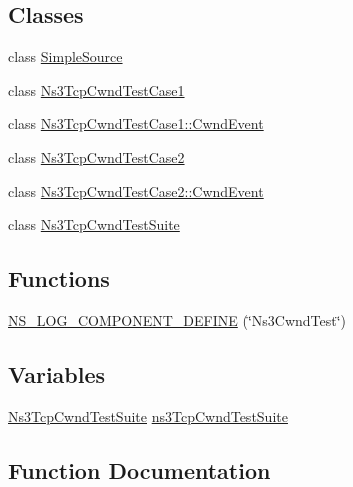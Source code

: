 \subsection*{Classes}
\begin{DoxyCompactItemize}
\item 
class \hyperlink{classSimpleSource}{Simple\+Source}
\item 
class \hyperlink{classNs3TcpCwndTestCase1}{Ns3\+Tcp\+Cwnd\+Test\+Case1}
\item 
class \hyperlink{classNs3TcpCwndTestCase1_1_1CwndEvent}{Ns3\+Tcp\+Cwnd\+Test\+Case1\+::\+Cwnd\+Event}
\item 
class \hyperlink{classNs3TcpCwndTestCase2}{Ns3\+Tcp\+Cwnd\+Test\+Case2}
\item 
class \hyperlink{classNs3TcpCwndTestCase2_1_1CwndEvent}{Ns3\+Tcp\+Cwnd\+Test\+Case2\+::\+Cwnd\+Event}
\item 
class \hyperlink{classNs3TcpCwndTestSuite}{Ns3\+Tcp\+Cwnd\+Test\+Suite}
\end{DoxyCompactItemize}
\subsection*{Functions}
\begin{DoxyCompactItemize}
\item 
\hyperlink{ns3tcp-cwnd-test-suite_8cc_a9d9b91a4131dddd374b3ab831d58ffb5}{N\+S\+\_\+\+L\+O\+G\+\_\+\+C\+O\+M\+P\+O\+N\+E\+N\+T\+\_\+\+D\+E\+F\+I\+NE} (\char`\"{}Ns3\+Cwnd\+Test\char`\"{})
\end{DoxyCompactItemize}
\subsection*{Variables}
\begin{DoxyCompactItemize}
\item 
\hyperlink{classNs3TcpCwndTestSuite}{Ns3\+Tcp\+Cwnd\+Test\+Suite} \hyperlink{ns3tcp-cwnd-test-suite_8cc_aa94be6c8243e756342fae9cfbad4cd4c}{ns3\+Tcp\+Cwnd\+Test\+Suite}
\end{DoxyCompactItemize}


\subsection{Function Documentation}
